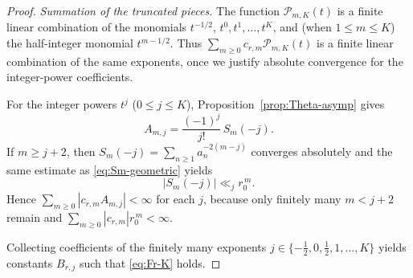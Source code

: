 \documentclass[10pt,a4paper]{amsart}
\begin{document}
\begin{proof}
\medskip
\noindent\emph{Summation of the truncated pieces.}
The function $\mathcal{P}_{m,K}(t)$ is a finite linear combination of the monomials
$t^{-1/2}$, $t^0,t^1,\dots,t^K$, and (when $1\le m\le K$) the half-integer monomial $t^{m-1/2}$.
Thus $\sum_{m\ge0}c_{r,m}\mathcal{P}_{m,K}(t)$ is a finite linear combination of the same exponents,
once we justify absolute convergence for the integer-power coefficients.

For the integer powers $t^j$ ($0\le j\le K$), Proposition~\ref{prop:Theta-asymp} gives
\[
A_{m,j}=\frac{(-1)^j}{j!}\,S_m(-j).
\]
If $m\ge j+2$, then $S_m(-j)=\sum_{n\ge1}a_n^{-2(m-j)}$ converges absolutely and the same estimate as
\eqref{eq:Sm-geometric} yields
\[
|S_m(-j)|\ll_j r_0^{\,m}.
\]
Hence $\sum_{m\ge0}|c_{r,m}A_{m,j}|<\infty$ for each $j$, because only finitely many $m<j+2$ remain and
$\sum_{m\ge0}|c_{r,m}|r_0^{\,m}<\infty$.

Collecting coefficients of the finitely many exponents
$j\in\{-\tfrac12,0,\tfrac12,1,\dots,K\}$ yields constants $B_{r,j}$ such that
\eqref{eq:Fr-K} holds.
\end{proof}
\end{document}

